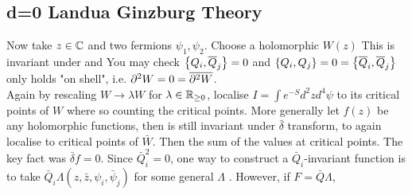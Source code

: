 \documentclass{article}
\begin{document}
\subsection{d=0 Landua Ginzburg Theory}
Now take $z\in\mbb{C}$ and two fermions $\psi_1,\psi_2$. Choose a holomorphic $W(z)$
This is invariant under 
and 
You may check $\acomm[Q_i]{\bar{Q}_j}=0$ and $\acomm[Q_i]{Q_j}=0=\acomm[\bar{Q}_i]{\bar{Q}_j}$ only holds "on shell", i.e. $\del^2 W = 0 = \bar{\del^2 W}$.\\
Again by rescaling $W \to \lambda W$ for $\lambda \in \mbb{R}_{\geq 0}$, localise $I = \int e^{-S} d^2z d^4\psi$ to its critical points of $W$ where 
so 
counting the critical points. More generally let $f(z)$ be any holomorphic functions, then 
is still invariant under $\bar{\delta}$ transform, to again localise to critical points of $\bar{W}$. Then 
the sum of the values at critical points. The key fact was $\bar{\delta}f=0$. Since $\bar{Q}_i^2=0$, one way to construct a $\bar{Q}_i$-invariant function is to take $\bar{Q}_i \Lambda(z,\bar{z},\psi_i,\bar{\psi}_j)$ for some general $\Lambda$ . However, if $F=\bar{Q}\Lambda$, 
\end{document}
